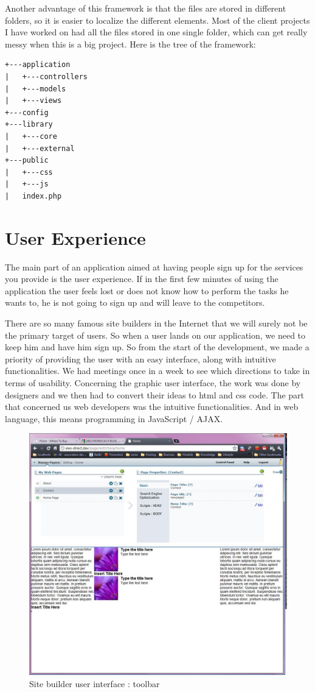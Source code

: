 Another advantage of this framework is that the files are stored in different folders, so it is easier to localize the different elements. Most of the client projects I have worked on had all the files stored in one single folder, which can get really messy when this is a big project.
Here is the tree of the framework:
\begin{verbatim}
+---application
|   +---controllers
|   +---models
|   +---views
+---config
+---library
|   +---core
|   +---external
+---public
|   +---css
|   +---js
|   index.php
\end{verbatim}

\section{User Experience}


The main part of an application aimed at having people sign up for the services you provide is the user experience. If in the first few minutes of using the application the user feels lost or does not know how to perform the tasks he wants to, he is not going to sign up and will leave to the competitors. 

There are so many famous site builders in the Internet that we will surely not be the primary target of users. So when a user lands on our application, we need to keep him and have him sign up. So from the start of the development, we made a priority of providing the user with an easy interface, along with intuitive functionalities.
We had meetings once in a week to see which directions to take in terms of usability. Concerning the graphic user interface, the work was done by designers and we then had to convert their ideas to html and css code. The part that concerned us web developers was the intuitive functionalities. And in web language, this means programming in JavaScript / AJAX.

\begin{figure}[h!]
\centering
\includegraphics[width=.55\textwidth]{img/ews_toolbar.jpg}
\caption{Site builder user interface : toolbar}
\label{figure:ews_toolbar}
\end{figure}

